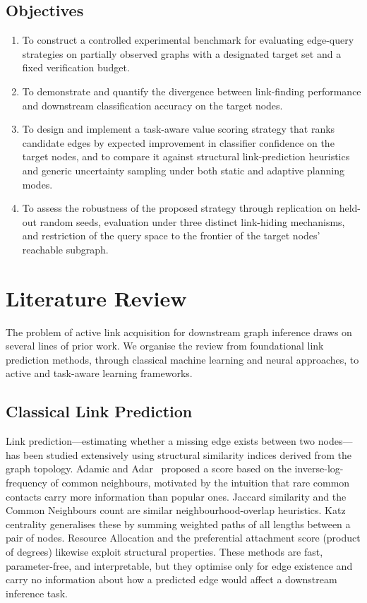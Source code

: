 \documentclass[11pt,a4paper]{article}
\begin{document}
\subsection{Objectives}

\begin{enumerate}[leftmargin=2em]
\item To construct a controlled experimental benchmark for evaluating edge-query strategies
on partially observed graphs with a designated target set and a fixed verification budget.
\item To demonstrate and quantify the divergence between link-finding performance and
downstream classification accuracy on the target nodes.
\item To design and implement a task-aware value scoring strategy that ranks candidate edges
by expected improvement in classifier confidence on the target nodes, and to compare it against
structural link-prediction heuristics and generic uncertainty sampling under both static and
adaptive planning modes.
\item To assess the robustness of the proposed strategy through replication on held-out random
seeds, evaluation under three distinct link-hiding mechanisms, and restriction of the query
space to the frontier of the target nodes' reachable subgraph.
\end{enumerate}

\section{Literature Review}

The problem of active link acquisition for downstream graph inference draws on several lines
of prior work. We organise the review from foundational link prediction methods, through
classical machine learning and neural approaches, to active and task-aware learning frameworks.

\subsection{Classical Link Prediction}

Link prediction---estimating whether a missing edge exists between two nodes---has been
studied extensively using structural similarity indices derived from the graph topology.
Adamic and Adar~\cite{adamic} proposed a score based on the inverse-log-frequency of common
neighbours, motivated by the intuition that rare common contacts carry more information than
popular ones. Jaccard similarity and the Common Neighbours count are similar
neighbourhood-overlap heuristics. Katz centrality generalises these by summing weighted
paths of all lengths between a pair of nodes. Resource Allocation and the preferential
attachment score (product of degrees) likewise exploit structural properties. These
methods are fast, parameter-free, and interpretable, but they optimise only for edge
existence and carry no information about how a predicted edge would affect a downstream
inference task.
\end{document}
